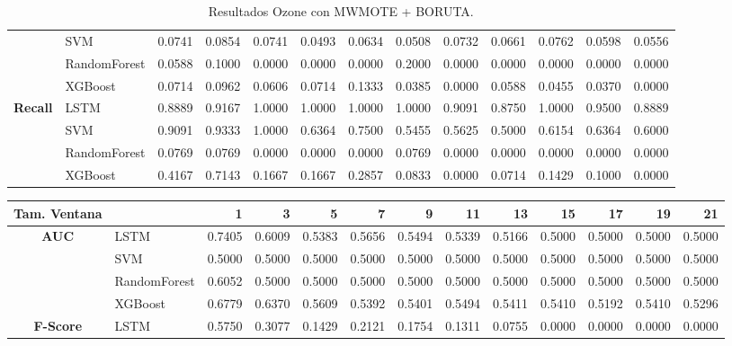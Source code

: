 \begin{table}[h]
\begin{adjustbox}{max width=15cm}
\begin{tabular}{|c|l|r|r|r|r|r|r|r|r|r|r|r|}
			& SVM &  0.0741 &  0.0854 &  0.0741 &  0.0493 &  0.0634 &  0.0508 &  0.0732 &  0.0661 &  0.0762 &  0.0598 &  0.0556 \\
			& RandomForest &  0.0588 &  0.1000 &  0.0000 &  0.0000 &  0.0000 &  0.2000 &  0.0000 &  0.0000 &  0.0000 &  0.0000 &  0.0000 \\
			& XGBoost &  0.0714 &  0.0962 &  0.0606 &  0.0714 &  0.1333 &  0.0385 &  0.0000 &  0.0588 &  0.0455 &  0.0370 &  0.0000 \\
			\hline
			\textbf{Recall} & LSTM &  0.8889 &  0.9167 &  1.0000 &  1.0000 &  1.0000 &  1.0000 &  0.9091 &  0.8750 &  1.0000 &  0.9500 &  0.8889 \\
			& SVM &  0.9091 &  0.9333 &  1.0000 &  0.6364 &  0.7500 &  0.5455 &  0.5625 &  0.5000 &  0.6154 &  0.6364 &  0.6000 \\
			& RandomForest &  0.0769 &  0.0769 &  0.0000 &  0.0000 &  0.0000 &  0.0769 &  0.0000 &  0.0000 &  0.0000 &  0.0000 &  0.0000 \\
			& XGBoost &  0.4167 &  0.7143 &  0.1667 &  0.1667 &  0.2857 &  0.0833 &  0.0000 &  0.0714 &  0.1429 &  0.1000 &  0.0000 \\
			\hline
		\end{tabular}
	\end{adjustbox}
	\caption{Resultados Ozone con MWMOTE + BORUTA.}
	\label{tab:Ozone_MWMOTE_BORUTA}
\end{table}\begin{table}[h]
\centering
\begin{adjustbox}{max width=15cm}
	\begin{tabular}{|c|l|r|r|r|r|r|r|r|r|r|r|r|}
		\hline
		\textbf{Tam. Ventana} &         &      1  &      3  &      5  &      7  &      9  &      11 &      13 &      15 &      17 &      19 &      21 \\
		\hline
		\textbf{AUC} & LSTM &  0.7405 &  0.6009 &  0.5383 &  0.5656 &  0.5494 &  0.5339 &  0.5166 &  0.5000 &  0.5000 &  0.5000 &  0.5000 \\
		& SVM &  0.5000 &  0.5000 &  0.5000 &  0.5000 &  0.5000 &  0.5000 &  0.5000 &  0.5000 &  0.5000 &  0.5000 &  0.5000 \\
		& RandomForest &  0.6052 &  0.5000 &  0.5000 &  0.5000 &  0.5000 &  0.5000 &  0.5000 &  0.5000 &  0.5000 &  0.5000 &  0.5000 \\
		& XGBoost &  0.6779 &  0.6370 &  0.5609 &  0.5392 &  0.5401 &  0.5494 &  0.5411 &  0.5410 &  0.5192 &  0.5410 &  0.5296 \\
		\hline
		\textbf{F-Score} & LSTM &  0.5750 &  0.3077 &  0.1429 &  0.2121 &  0.1754 &  0.1311 &  0.0755 &  0.0000 &  0.0000 &  0.0000 &  0.0000 \\

\end{tabular}
\end{adjustbox}
\end{table}
